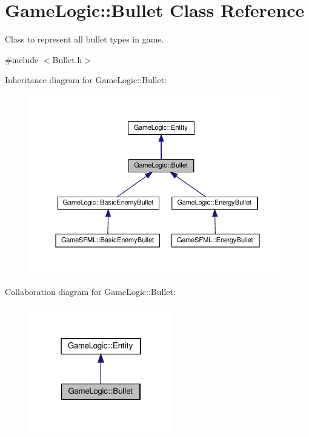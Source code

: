 \hypertarget{classGameLogic_1_1Bullet}{}\section{Game\+Logic\+:\+:Bullet Class Reference}
\label{classGameLogic_1_1Bullet}


Class to represent all bullet types in game.  




{\ttfamily \#include $<$Bullet.\+h$>$}



Inheritance diagram for Game\+Logic\+:\+:Bullet\+:
\nopagebreak
\begin{figure}[H]
\begin{center}
\leavevmode
\includegraphics[width=350pt]{classGameLogic_1_1Bullet__inherit__graph}
\end{center}
\end{figure}


Collaboration diagram for Game\+Logic\+:\+:Bullet\+:
\nopagebreak
\begin{figure}[H]
\begin{center}
\leavevmode
\includegraphics[width=178pt]{classGameLogic_1_1Bullet__coll__graph}
\end{center}
\end{figure}
